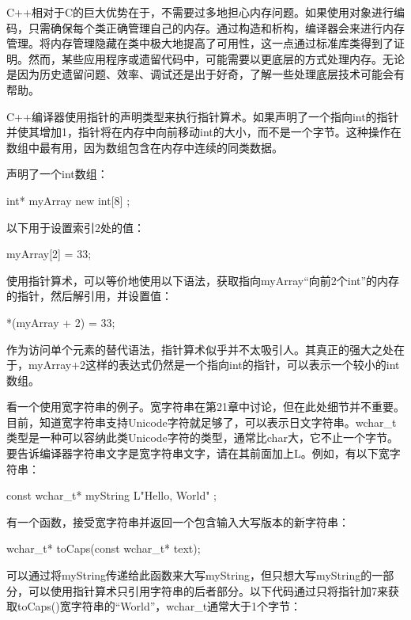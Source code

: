 
C++相对于C的巨大优势在于，不需要过多地担心内存问题。如果使用对象进行编码，只需确保每个类正确管理自己的内存。通过构造和析构，编译器会来进行内存管理。将内存管理隐藏在类中极大地提高了可用性，这一点通过标准库类得到了证明。然而，某些应用程序或遗留代码中，可能需要以更底层的方式处理内存。无论是因为历史遗留问题、效率、调试还是出于好奇，了解一些处理底层技术可能会有帮助。


C++编译器使用指针的声明类型来执行指针算术。如果声明了一个指向int的指针并使其增加1，指针将在内存中向前移动int的大小，而不是一个字节。这种操作在数组中最有用，因为数组包含在内存中连续的同类数据。

声明了一个int数组：

\begin{cpp}
int* myArray { new int[8] };
\end{cpp}

以下用于设置索引2处的值：

\begin{cpp}
myArray[2] = 33;
\end{cpp}

使用指针算术，可以等价地使用以下语法，获取指向myArray“向前2个int”的内存的指针，然后解引用，并设置值：

\begin{cpp}
*(myArray + 2) = 33;
\end{cpp}

作为访问单个元素的替代语法，指针算术似乎并不太吸引人。其真正的强大之处在于，myArray+2这样的表达式仍然是一个指向int的指针，可以表示一个较小的int数组。

看一个使用宽字符串的例子。宽字符串在第21章中讨论，但在此处细节并不重要。目前，知道宽字符串支持Unicode字符就足够了，可以表示日文字符串。wchar\_t类型是一种可以容纳此类Unicode字符的类型，通常比char大，它不止一个字节。要告诉编译器字符串文字是宽字符串文字，请在其前面加上L。例如，有以下宽字符串：

\begin{cpp}
const wchar_t* myString { L"Hello, World" };
\end{cpp}

有一个函数，接受宽字符串并返回一个包含输入大写版本的新字符串：

\begin{cpp}
wchar_t* toCaps(const wchar_t* text);
\end{cpp}

可以通过将myString传递给此函数来大写myString，但只想大写myString的一部分，可以使用指针算术只引用字符串的后者部分。以下代码通过只将指针加7来获取toCaps()宽字符串的“World”，wchar\_t通常大于1个字节：

